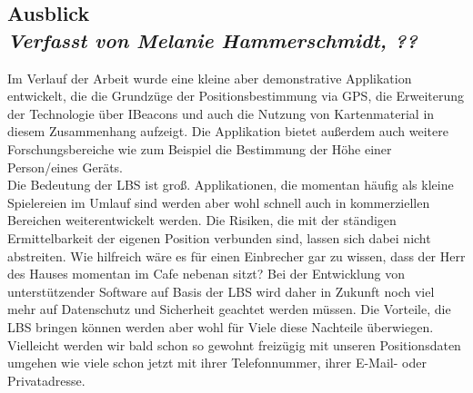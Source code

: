 \subsection[Ausblick]{Ausblick
 \\ \textnormal{\small{\textit {Verfasst von Melanie Hammerschmidt, ??}}}}
Im Verlauf der Arbeit wurde eine kleine aber demonstrative Applikation entwickelt, die die Grundzüge der Positionsbestimmung via GPS, die Erweiterung der Technologie über IBeacons und auch die Nutzung von Kartenmaterial in diesem Zusammenhang aufzeigt. Die Applikation bietet außerdem auch weitere Forschungsbereiche wie zum Beispiel die Bestimmung der Höhe einer Person/eines Geräts.
\\
Die Bedeutung der LBS ist groß. Applikationen, die momentan häufig als kleine Spielereien im Umlauf sind werden aber wohl schnell auch in kommerziellen Bereichen weiterentwickelt werden. Die Risiken, die mit der ständigen Ermittelbarkeit der eigenen Position verbunden sind, lassen sich dabei nicht abstreiten. Wie hilfreich wäre es für einen Einbrecher gar zu wissen, dass der Herr des Hauses momentan im Cafe nebenan sitzt? Bei der Entwicklung von unterstützender Software auf Basis der LBS wird daher in Zukunft noch viel mehr auf Datenschutz und Sicherheit geachtet werden müssen. Die Vorteile, die LBS bringen können werden aber wohl für Viele diese Nachteile überwiegen. Vielleicht werden wir bald schon so gewohnt freizügig mit unseren Positionsdaten umgehen wie viele schon jetzt mit ihrer Telefonnummer, ihrer E-Mail- oder Privatadresse.